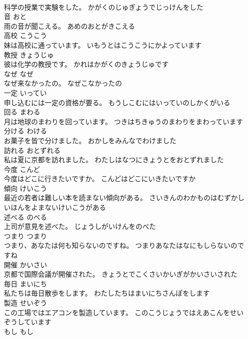\documentclass[8pt]{extreport}
\begin{document}
\begin{CJK}{UTF8}{min}
\\	科学の授業で実験をした。	かがくのじゅぎょうでじっけんをした	
\\	音	おと	
\\	雨の音が聞こえる。	あめのおとがきこえる	
\\	高校	こうこう	
\\	妹は高校に通っています。	いもうとはこうこうにかよっています	
\\	教授	きょうじゅ	
\\	彼は化学の教授です。	かれはかがくのきょうじゅです	
\\	なぜ	なぜ	
\\	なぜ来なかったの。	なぜこなかったの	
\\	一定	いってい	
\\	申し込むには一定の資格が要る。	もうしこむにはいっていのしかくがいる	
\\	回る	まわる	
\\	月は地球のまわりを回っています。	つきはちきゅうのまわりをまわっています	
\\	分ける	わける	
\\	お菓子を皆で分けました。	おかしをみんなでわけました	
\\	訪れる	おとずれる	
\\	私は夏に京都を訪れました。	わたしはなつにきょうとをおとずれました	
\\	今度	こんど	
\\	今度はどこに行きたいですか。	こんどはどこにいきたいですか	
\\	傾向	けいこう	
\\	最近の若者は難しい本を読まない傾向がある。	さいきんのわかものはむずかしいほんをよまないけいこうがある	
\\	述べる	のべる	
\\	上司が意見を述べた。	じょうしがいけんをのべた	
\\	つまり	つまり	
\\	つまり、あなたは何も知らないのですね。	つまりあなたはなにもしらないのですね	
\\	開催	かいさい	
\\	京都で国際会議が開催された。	きょうとでこくさいかいぎがかいさいされた	
\\	毎日	まいにち	
\\	私たちは毎日散歩をします。	わたしたちはまいにちさんぽをします	
\\	製造	せいぞう	
\\	この工場ではエアコンを製造しています。	このこうじょうではえあこんをせいぞうしています	
\\	もし	もし	

\end{CJK}
\end{document}
